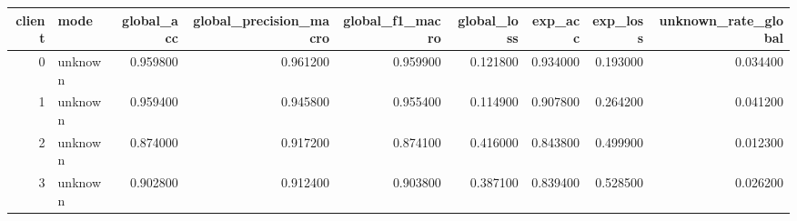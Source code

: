 \begin{tabular}{rlrrrrrrr}
\toprule
client & mode & global_acc & global_precision_macro & global_f1_macro & global_loss & exp_acc & exp_loss & unknown_rate_global \\
\midrule
0 & unknown & 0.959800 & 0.961200 & 0.959900 & 0.121800 & 0.934000 & 0.193000 & 0.034400 \\
1 & unknown & 0.959400 & 0.945800 & 0.955400 & 0.114900 & 0.907800 & 0.264200 & 0.041200 \\
2 & unknown & 0.874000 & 0.917200 & 0.874100 & 0.416000 & 0.843800 & 0.499900 & 0.012300 \\
3 & unknown & 0.902800 & 0.912400 & 0.903800 & 0.387100 & 0.839400 & 0.528500 & 0.026200 \\
\bottomrule
\end{tabular}
